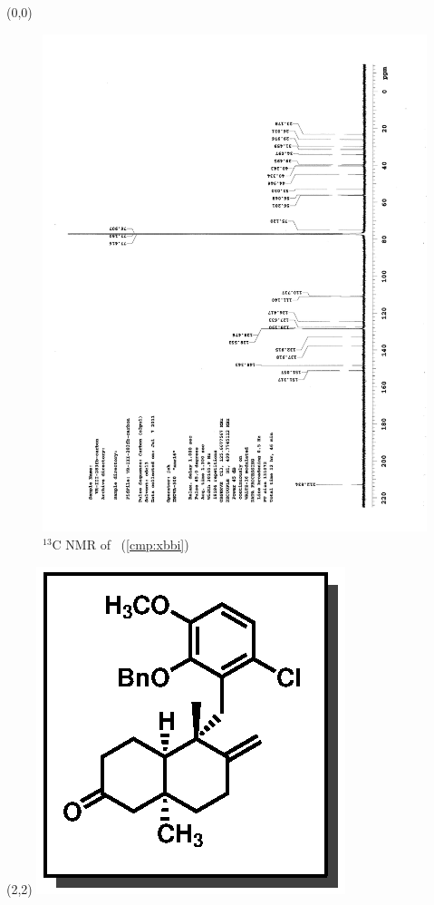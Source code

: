 \clearpage
\begin{textblock}{20}(0,0)
\begin{figure}[htb]
\caption{$^{13}$C NMR of  \CMPxbbi\ (\ref{cmp:xbbi})}
\includegraphics[scale=0.75, trim = 0mm 0mm 0mm 5mm,
clip]{chp_singlecarbon/images/nmr/xbbiC}
\vspace{-100pt}
\end{figure}
\end{textblock}
\begin{textblock}{1}(2,2)
\includegraphics[scale=0.8, angle=90]{chp_singlecarbon/images/xbbi}
\end{textblock}
\clearpage

